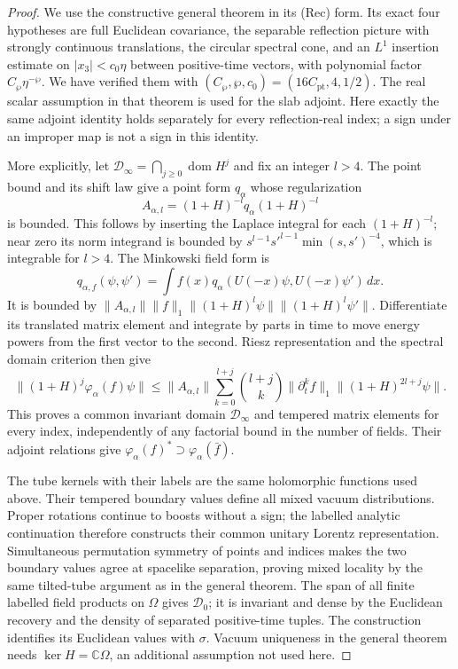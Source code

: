 \documentclass[11pt,letterpaper,reqno]{amsart}
\theoremstyle{definition}
\theoremstyle{remark}
\begin{document}
\begin{proof}
We use the constructive general theorem
\cite[Theorem AO]{YMM1} in its (Rec) form.
Its exact four hypotheses are full Euclidean
covariance, the separable reflection picture with
strongly continuous translations, the circular
spectral cone, and an $L^1$ insertion estimate on
$|x_3|<c_0\eta$ between positive-time vectors,
with polynomial factor $C_\wp\eta^{-\wp}$.
We have verified them with
$(C_\wp,\wp,c_0)=(16C_{\mathrm{pt}},4,1/2)$.
The real scalar assumption in that theorem is
used for the slab adjoint.  Here exactly the same
adjoint identity holds separately for every
reflection-real index; a sign under an improper
map is not a sign in this identity.

More explicitly, let
$\mathcal D_\infty=\bigcap_{j\ge0}\operatorname{dom}H^j$
and fix an integer $l>4$.  The point bound and its
shift law give a point form $q_\alpha$ whose
regularization
\[
 A_{\alpha,l}=(1+H)^{-l}q_\alpha(1+H)^{-l}
\]
is bounded.  This follows by inserting the Laplace
integral for each $(1+H)^{-l}$; near zero its norm
integrand is bounded by
$s^{l-1}s'^{l-1}\min(s,s')^{-4}$, which is
integrable for $l>4$.
The Minkowski field form is
\[
 q_{\alpha,f}(\psi,\psi')=
 \int f(x)q_\alpha(U(-x)\psi,U(-x)\psi')\,dx.
\]
It is bounded by
$\|A_{\alpha,l}\|\|f\|_1
\|(1+H)^l\psi\|\|(1+H)^l\psi'\|$.
Differentiate its translated matrix element and
integrate by parts in time to move energy powers
from the first vector to the second.  Riesz
representation and the spectral domain criterion
then give
\[
 \|(1+H)^j\varphi_\alpha(f)\psi\|
 \le\|A_{\alpha,l}\|
 \sum_{k=0}^{l+j}\binom{l+j}{k}
       \|\partial_t^kf\|_1
                         \|(1+H)^{2l+j}\psi\|.
\]
This proves a common invariant domain
$\mathcal D_\infty$ and tempered matrix elements
for every index, independently of any factorial
bound in the number of fields.  Their adjoint
relations give
$\varphi_\alpha(f)^*\supset\varphi_\alpha(\bar f)$.

The tube kernels with their labels are the same
holomorphic functions used above.  Their tempered
boundary values define all mixed vacuum
distributions.  Proper rotations continue to
boosts without a sign; the labelled analytic
continuation therefore constructs their common
unitary Lorentz representation.  Simultaneous
permutation symmetry of points and indices makes
the two boundary values agree at spacelike
separation, proving mixed locality by the same
tilted-tube argument as in the general theorem.
The span of all finite labelled field products
on $\Omega$ gives $\mathcal D_0$; it is invariant
and dense by the Euclidean recovery and the
density of separated positive-time tuples.
The construction identifies its Euclidean values
with $\sigma$.  Vacuum uniqueness in the general
theorem needs $\ker H=\mathbb C\Omega$, an
additional assumption not used here.
\end{proof}
\end{document}
